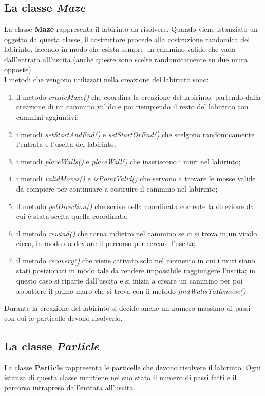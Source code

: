 \documentclass[10pt,twocolumn,letterpaper]{article}
\begin{document}
\subsection{La classe \textit{Maze}}
La classe \textbf{Maze} rappresenta il labirinto da risolvere. Quando viene istanziato un oggetto da questa classe, il costruttore procede alla costruzione randomica del labirinto, facendo in modo che esista sempre un cammino valido che vada dall'entrata all'uscita (anche queste sono scelte randomicamente su due mura opposte).\\
I metodi che vengono utilizzati nella creazione del labirinto sono:
\begin{enumerate}
\item{il metodo \textit{createMaze()} che coordina la creazione del labirinto, partendo dalla creazione di un cammino valido e poi riempiendo il resto del labirinto con cammini aggiuntivi;}
\item{i metodi \textit{setStartAndEnd()} e \textit{setStartOrEnd()} che scelgono randomicamente l'entrata e l'uscita del labirinto;}
\item{i metodi \textit{placeWalls()} e \textit{placeWall()} che inseriscono i muri nel labirinto;}
\item{i metodi \textit{validMoves()} e \textit{isPointValid()} che servono a trovare le mosse valide da compiere per continuare a costruire il cammino nel labirinto;}
\item{il metodo \textit{getDirection()} che scrive nella coordinata corrente la direzione da cui è stata scelta quella coordinata;}
\item{il metodo \textit{rewind()} che torna indietro nel cammino se ci si trova in un vicolo cieco, in modo da deviare il percorso per cercare l'uscita;}
\item{il metodo \textit{recovery()} che viene attivato solo nel momento in cui i muri siano stati posizionati in modo tale da rendere impossibile raggiungere l'uscita; in questo caso si riparte dall'uscita e si inizia a creare un cammino per poi abbattere il primo muro che si trova con il metodo \textit{findWallsToRemove()}.}
\end{enumerate}
Durante la creazione del labirinto si decide anche un numero massimo di passi con cui le particelle devono risolverlo.

\subsection{La classe \textit{Particle}}
La classe \textbf{Particle} rappresenta le particelle che devono risolvere il labirinto. Ogni istanza di questa classe mantiene nel suo stato il numero di passi fatti e il percorso intrapreso dall'entrata all'uscita.
\end{document}
